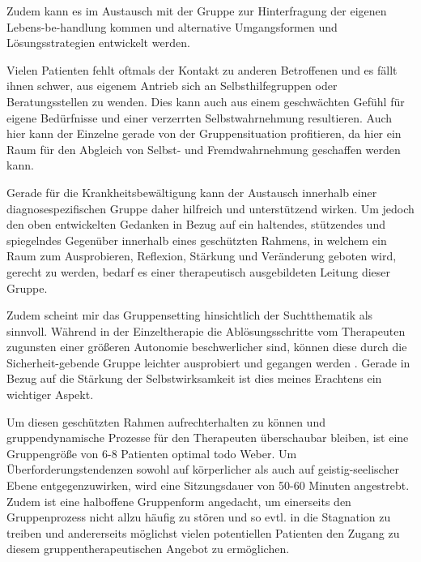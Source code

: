 Zudem kann es im Austausch mit der Gruppe zur Hinterfragung der eigenen Lebens-be-handlung kommen und alternative Umgangsformen und Lösungsstrategien entwickelt werden. 

Vielen Patienten fehlt oftmals der Kontakt zu anderen Betroffenen und es fällt ihnen schwer, aus eigenem Antrieb sich an Selbsthilfegruppen oder Beratungsstellen zu wenden. Dies kann auch aus einem geschwächten Gefühl für eigene Bedürfnisse und einer verzerrten Selbstwahrnehmung resultieren. Auch hier kann der Einzelne gerade von der Gruppensituation profitieren, da hier ein Raum für den Abgleich von Selbst- und Fremdwahrnehmung geschaffen werden kann.

Gerade für die Krankheitsbewältigung kann der Austausch innerhalb einer diagnosespezifischen Gruppe daher hilfreich und unterstützend wirken. Um jedoch den oben entwickelten Gedanken in Bezug auf ein haltendes, stützendes und spiegelndes Gegenüber innerhalb eines geschützten Rahmens, in welchem ein Raum zum Ausprobieren, Reflexion, Stärkung und Veränderung geboten wird, gerecht zu werden, bedarf es einer therapeutisch ausgebildeten Leitung dieser Gruppe. 

Zudem scheint mir das Gruppensetting hinsichtlich der Suchtthematik als sinnvoll. Während in der Einzeltherapie die Ablösungsschritte vom Therapeuten zugunsten einer größeren Autonomie beschwerlicher sind, können diese durch die Sicherheit-gebende Gruppe leichter ausprobiert und gegangen werden \autocite[vgl.]{nawe2014}. Gerade in Bezug auf die Stärkung der Selbstwirksamkeit ist dies meines Erachtens ein wichtiger Aspekt.

Um diesen geschützten Rahmen aufrechterhalten zu können und gruppendynamische Prozesse für den Therapeuten überschaubar bleiben, ist eine Gruppengröße von 6-8 Patienten optimal todo Weber. Um Überforderungstendenzen sowohl auf körperlicher als auch auf geistig-seelischer Ebene entgegenzuwirken, wird eine Sitzungsdauer von 50-60 Minuten angestrebt. Zudem ist eine halboffene Gruppenform angedacht, um einerseits den Gruppenprozess nicht allzu häufig zu stören und so evtl. in die Stagnation zu treiben und andererseits möglichst vielen potentiellen Patienten den Zugang zu diesem gruppentherapeutischen Angebot zu ermöglichen. 

